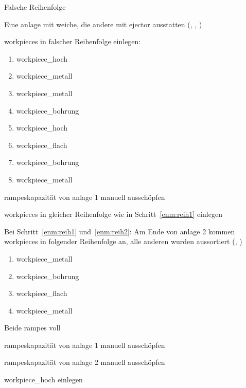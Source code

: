     \begin{ablauf}{Falsche Reihenfolge}
        \item Eine \gls{anlage} mit \gls{weiche}, die andere mit \gls{ejector} ausstatten
        (, , )
        \item \Glspl{workpiece} in falscher Reihenfolge einlegen:\label{enm:reih1}
        \begin{enumerate}
            \item \gls{workpiece_hoch} %
            \item \gls{workpiece_metall}
            \item \gls{workpiece_metall} %
            \item \gls{workpiece_bohrung}
            \item \gls{workpiece_hoch} %
            \item \gls{workpiece_flach}
            \item \gls{workpiece_bohrung} %
            \item \gls{workpiece_metall}
        \end{enumerate}
        \item \Glspl{rampe}kapazität von \gls{anlage} 1 manuell ausschöpfen
        \item \Glspl{workpiece} in gleicher Reihenfolge wie in
        Schritt~\ref{enm:reih1} einlegen\label{enm:reih2}
    \end{ablauf}

    \begin{erwartung}
        \item Bei Schritt~\ref{enm:reih1} und~\ref{enm:reih2}: Am Ende von \gls{anlage} 2 kommen
        \Glspl{workpiece} in folgender Reihenfolge an,
        alle anderen wurden aussortiert (, )
        \begin{enumerate}
            \item \gls{workpiece_metall}
            \item \gls{workpiece_bohrung}
            \item \gls{workpiece_flach}
            \item \gls{workpiece_metall}
        \end{enumerate}
    \end{erwartung}

    \begin{ablauf}{Beide \glspl{rampe} voll}
        \item \Glspl{rampe}kapazität von \gls{anlage} 1 manuell ausschöpfen\label{enm:rampe1-voll}
        \item \Glspl{rampe}kapazität von \gls{anlage} 2 manuell ausschöpfen\label{enm:rampe2-voll}
        \item \gls{workpiece_hoch} einlegen\label{enm:beide-rutschen-voll-und-einlegen}
    \end{ablauf}

